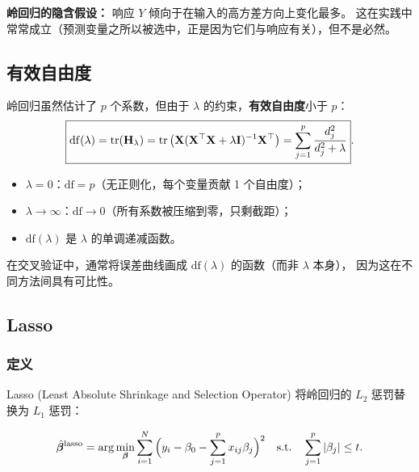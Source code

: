 \textbf{岭回归的隐含假设：} 响应 $Y$ 倾向于在输入的高方差方向上变化最多。
这在实践中常常成立（预测变量之所以被选中，正是因为它们与响应有关），但不是必然。

\subsection{有效自由度}

岭回归虽然估计了 $p$ 个系数，但由于 $\lambda$ 的约束，\textbf{有效自由度}小于 $p$：
\begin{equation}\label{eq:df_ridge}
    \boxed{\mathrm{df}(\lambda) = \operatorname{tr}(\mathbf{H}_\lambda)
    = \operatorname{tr}\big(\mathbf{X}(\mathbf{X}^\top \mathbf{X} + \lambda \mathbf{I})^{-1} \mathbf{X}^\top\big)
    = \sum_{j=1}^{p} \frac{d_j^2}{d_j^2 + \lambda}}.
\end{equation}

\begin{itemize}
    \item $\lambda = 0$：$\mathrm{df} = p$（无正则化，每个变量贡献 1 个自由度）；
    \item $\lambda \to \infty$：$\mathrm{df} \to 0$（所有系数被压缩到零，只剩截距）；
    \item $\mathrm{df}(\lambda)$ 是 $\lambda$ 的单调递减函数。
\end{itemize}

在交叉验证中，通常将误差曲线画成 $\mathrm{df}(\lambda)$ 的函数（而非 $\lambda$ 本身），
因为这在不同方法间具有可比性。

\subsection{Lasso}

\subsubsection{定义}

Lasso (Least Absolute Shrinkage and Selection Operator) 将岭回归的 $L_2$ 惩罚替换为 $L_1$ 惩罚：

\begin{definition}
\begin{equation}\label{eq:lasso_constrained}
    \hat{\bm{\beta}}^{\text{lasso}}
    = \arg\min_{\bm{\beta}} \sum_{i=1}^{N} \Big(y_i - \beta_0 - \sum_{j=1}^{p} x_{ij}\beta_j\Big)^2
    \quad \text{s.t.} \quad \sum_{j=1}^{p} |\beta_j| \le t.
\end{equation}
\end{definition}

